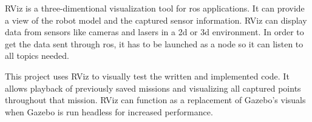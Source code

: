 RViz is a three\hyp{}dimentional visualization tool for \acs{ros} applications. It can provide a view of the robot model and the captured sensor information. RViz can display data from sensors like cameras and lasers in a \acs{2d} or \acs{3d} environment. In order to get the data sent through \acs{ros}, it has to be launched as a node so it can listen to all topics needed. \cite{aws_robomaker_developer_guide}

This project uses RViz to visually test the written and implemented code. It allows playback of previously saved missions and visualizing all captured points throughout that mission. RViz can function as a replacement of Gazebo's visuals when Gazebo is run headless for increased performance.